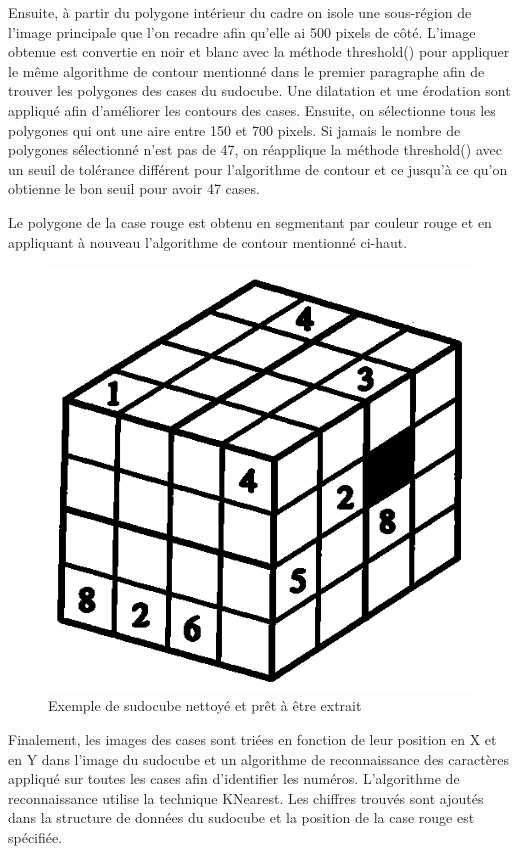 Ensuite, à partir du polygone intérieur du cadre on isole une sous-région de l'image principale que l'on recadre afin qu'elle ai 500 pixels de côté. L'image obtenue est convertie en noir et blanc avec la méthode threshold() pour appliquer le même algorithme de contour mentionné dans le premier paragraphe afin de trouver les polygones des cases du sudocube. Une dilatation et une érodation sont appliqué afin d'améliorer les contours des cases. Ensuite, on sélectionne tous les polygones qui ont une aire entre 150 et 700 pixels. Si jamais le nombre de polygones sélectionné n'est pas de 47, on réapplique la méthode threshold() avec un seuil de tolérance différent pour l'algorithme de contour et ce jusqu'à ce qu'on obtienne le bon seuil pour avoir 47 cases. 

Le polygone de la case rouge est obtenu en segmentant par couleur rouge et en appliquant à nouveau l'algorithme de contour mentionné ci-haut. 

\begin{figure}[h!]
\centering
\includegraphics[scale=0.60]{fig/sudocubeThresh.jpeg}
\caption{Exemple de sudocube nettoyé et prêt à être extrait}
\label{fig:sudocube_thresh}
\end{figure}

Finalement, les images des cases sont triées en fonction de leur position en X et en Y dans l'image du sudocube et un algorithme de reconnaissance des caractères appliqué sur toutes les cases afin d'identifier les numéros. L'algorithme de reconnaissance utilise la technique KNearest. Les chiffres trouvés sont ajoutés dans la structure de données du sudocube et la position de la case rouge est spécifiée.

